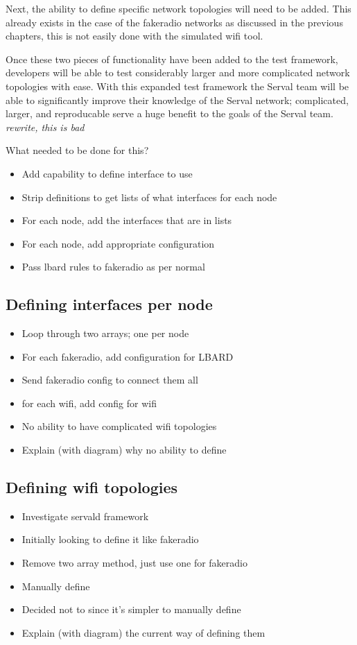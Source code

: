 Next, the ability to define specific network topologies will need to be added.
This already exists in the case of the fakeradio networks as discussed in the previous chapters, this is not easily done with the simulated wifi tool.

Once these two pieces of functionality have been added to the test framework, developers will be able to test considerably larger and more complicated network topologies with ease.
With this expanded test framework the Serval team will be able to significantly improve their knowledge of the Serval network; complicated, larger, and reproducable serve a huge benefit to the goals of the Serval team. \emph{rewrite, this is bad}
\linebreak

What needed to be done for this?
\begin{itemize}
    \item Add capability to define interface to use
    \item Strip definitions to get lists of what interfaces for each node
    \item For each node, add the interfaces that are in lists
    \item For each node, add appropriate configuration
    \item Pass lbard rules to fakeradio as per normal
\end{itemize}

\subsection{Defining interfaces per node}
\begin{itemize}
    \item Loop through two arrays; one per node
    \item For each fakeradio, add configuration for LBARD
    \item Send fakeradio config to connect them all
    \item for each wifi, add config for wifi
    \item No ability to have complicated wifi topologies
    \item Explain (with diagram) why no ability to define
\end{itemize}

\subsection{Defining wifi topologies}
\begin{itemize}
    \item Investigate servald framework
    \item Initially looking to define it like fakeradio
    \item Remove two array method, just use one for fakeradio
    \item Manually define 
    \item Decided not to since it's simpler to manually define

    \item Explain (with diagram) the current way of defining them
\end{itemize}

